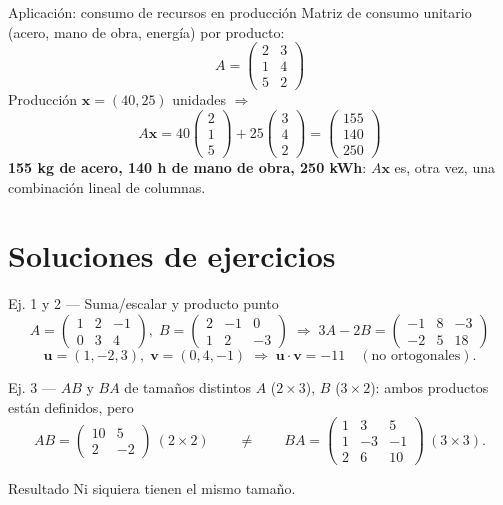 \documentclass[11pt]{beamer}
\newcommand{\vv}[1]{\mathbf{#1}}
\begin{document}
\begin{frame}{Aplicación: consumo de recursos en producción}
  Matriz de consumo unitario (acero, mano de obra, energía) por producto:
  \[
    A = \begin{pmatrix}2&3\\1&4\\5&2\end{pmatrix}
  \]
  Producción $\vv{x}=(40,25)$ unidades $\Rightarrow$
  \[
    A\vv{x} = 40\begin{pmatrix}2\\1\\5\end{pmatrix} + 25\begin{pmatrix}3\\4\\2\end{pmatrix}
    = \begin{pmatrix}155\\140\\250\end{pmatrix}
  \]
  \textbf{155 kg de acero, 140 h de mano de obra, 250 kWh}: $A\vv{x}$ es, otra vez, una
  combinación lineal de columnas.
\end{frame}

\section{Soluciones de ejercicios}

\begin{frame}{Ej. 1 y 2 — Suma/escalar y producto punto}
  \[
    A=\begin{pmatrix}1&2&-1\\0&3&4\end{pmatrix},\; B=\begin{pmatrix}2&-1&0\\1&2&-3\end{pmatrix}
    \;\Rightarrow\; 3A-2B=\begin{pmatrix}-1&8&-3\\-2&5&18\end{pmatrix}
  \]
  \[
    \vv{u}=(1,-2,3),\;\vv{v}=(0,4,-1) \;\Rightarrow\; \vv{u}\cdot\vv{v}=-11 \quad(\text{no
    ortogonales}).
  \]
\end{frame}

\begin{frame}{Ej. 3 — \texorpdfstring{$AB$}{AB} y \texorpdfstring{$BA$}{BA} de tamaños distintos}
  $A$ ($2\times 3$), $B$ ($3\times 2$): ambos productos están definidos, pero
  \[
    AB=\begin{pmatrix}10&5\\2&-2\end{pmatrix}\ (2\times 2) \qquad\neq\qquad
    BA=\begin{pmatrix}1&3&5\\1&-3&-1\\2&6&10\end{pmatrix}\ (3\times 3).
  \]
  \begin{alertblock}{Resultado}
    Ni siquiera tienen el mismo tamaño.
  \end{alertblock}
\end{frame}
\end{document}
